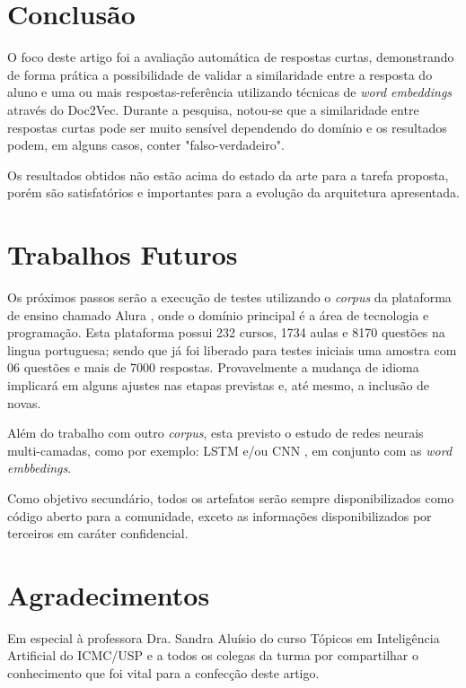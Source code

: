 \documentclass[conference]{IEEEtran}
\begin{document}
\section{Conclusão}
O foco deste artigo foi a avaliação automática de respostas curtas, demonstrando de forma prática a possibilidade de validar a similaridade entre a resposta do aluno e uma ou mais respostas-referência utilizando técnicas de \textit{word embeddings} através do Doc2Vec. Durante a pesquisa, notou-se que a similaridade entre respostas curtas pode ser muito sensível dependendo do domínio e os resultados podem, em alguns casos, conter "falso-verdadeiro".

Os resultados obtidos não estão acima do estado da arte para a tarefa proposta, porém são satisfatórios e importantes para a evolução da arquitetura apresentada.

\section{Trabalhos Futuros}
Os próximos passos serão a execução de testes utilizando o \textit{corpus} da plataforma de ensino chamado Alura \cite{Alura:2016}, onde o domínio principal é a área de tecnologia e programação. Esta plataforma possui 232 cursos, 1734 aulas e 8170 questões na lingua portuguesa; sendo que já foi liberado para testes iniciais uma amostra com 06 questões e mais de 7000 respostas. Provavelmente a mudança de idioma implicará em alguns ajustes nas etapas previstas e, até mesmo, a inclusão de novas.

Além do trabalho com outro \textit{corpus}, esta previsto o estudo de redes neurais multi-camadas, como por exemplo: LSTM \cite{SkymindLSTM:2016} e/ou CNN \cite{SkymindCNN:2016}, em conjunto com as \textit{word embbedings}.

Como objetivo secundário, todos os artefatos serão sempre disponibilizados como código aberto para a comunidade, exceto as informações disponibilizados por terceiros em caráter confidencial.


\section*{Agradecimentos}
Em especial à professora Dra. Sandra Aluísio do curso Tópicos em Inteligência Artificial do ICMC/USP e a todos os colegas da turma por compartilhar o conhecimento que foi vital para a confecção deste artigo.
\end{document}
